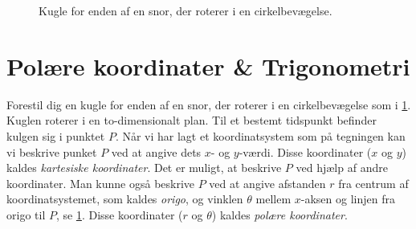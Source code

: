 \begin{figure}
    \centering
    \caption{Kugle for enden af en snor, der roterer i en cirkelbevægelse.}
    \label{mat:fig:pol_koor}
\end{figure}

\section{Polære koordinater \& Trigonometri} \label{mat:sec:trig}
Forestil dig en kugle for enden af en snor, der roterer i
en cirkelbevægelse som i \cref{mat:fig:pol_koor}. Kuglen roterer i en to-dimensionalt plan. Til et bestemt tidspunkt befinder kulgen sig i punktet $P$. Når vi har lagt et koordinatsystem som på tegningen kan vi beskrive punket $P$ ved at angive dets $x$- og $y$-værdi. Disse koordinater ($x$ og $y$) kaldes \emph{kartesiske koordinater}. Det er muligt, at beskrive $P$ ved hjælp af andre koordinater. Man kunne også beskrive $P$ ved at angive afstanden $r$ fra centrum af koordinatsystemet, som kaldes \textit{origo}, og vinklen $\theta$ mellem $x$-aksen og linjen fra origo til $P$, se \cref{mat:fig:pol_koor}. Disse koordinater ($r$ og $\theta$) kaldes \emph{polære koordinater}.

